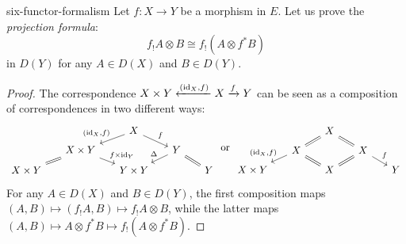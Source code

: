 \begin{example}{six-functor-formalism}
    Let $f \colon X \to Y$ be a morphism in $E$. Let us prove the \textit{projection formula}:
    \[ f_! A \otimes B \cong f_! (A \otimes f^* B) \]
    in $D(Y)$ for any $A \in D(X)$ and $B \in D(Y)$.
    \begin{proof}
        The correspondence $X \times Y \xleftarrow{(\textup{id}_X, f)} X \xrightarrow{f} Y$ can be seen as a composition of correspondences in two different ways:
        \[ \svg \begin{tikzcd}[row sep=0.5em, column sep=1.5em] & & X \arrow[swap]{dl}{(\id_X, f)} \arrow{dr}{f} & & \\ & X \times Y \arrow[equals]{dl} \arrow{dr}{f \times \id_Y} & & Y \arrow[swap]{dl}{\Delta} \arrow[equals]{dr} & \\ X \times Y & & Y \times Y & & Y \end{tikzcd} \textup{ or } \begin{tikzcd}[row sep=0.5em, column sep=1.5em] & & X \arrow[equals]{dl} \arrow[equals]{dr} & & \\ & X \arrow[swap]{dl}{(\id_X, f)} \arrow[equals]{dr} & & X \arrow[equals]{dl} \arrow{dr}{f} & \\ X \times Y & & X & & Y \end{tikzcd} \]
        For any $A \in D(X)$ and $B \in D(Y)$, the first composition maps $(A, B) \mapsto (f_! A, B) \mapsto f_! A \otimes B$, while the latter maps $(A, B) \mapsto A \otimes f^* B \mapsto f_!(A \otimes f^* B)$.
    \end{proof}
\end{example}
